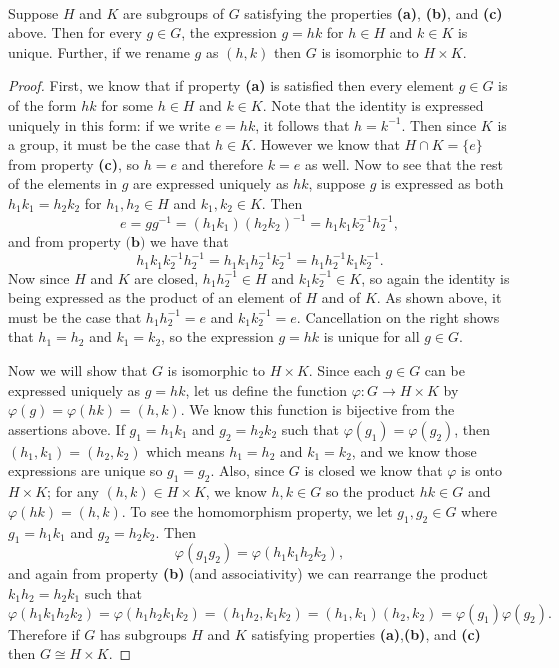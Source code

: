 \documentclass{article}
\newenvironment{problem1}[1]{\noindent {\bf Problem #1:}}
{\medskip}
\begin{document}
\begin{problem1}{51}\\ Suppose $H$ and $K$ are subgroups of $G$ satisfying the properties \textbf{(a)}, \textbf{(b)}, and \textbf{(c)} above. Then for every $g\in G$, the expression $g=hk$ for $h\in H$ and $k\in K$ is unique. Further, if we rename $g$ as $(h,k)$ then $G$ is isomorphic to $H\times K$.
\end{problem1}

\begin{proof} First, we know that if property \textbf{(a)} is satisfied then every element $g\in G$ is of the form $hk$ for some $h\in H$ and $k\in K$. Note that the identity is expressed uniquely in this form: if we write $e=hk$, it follows that $h=k^{-1}$. Then since $K$ is a group, it must be the case that $h\in K$. However we know that $H\cap K=\{e\}$ from property \textbf{(c)}, so $h=e$ and therefore $k=e$ as well. Now to see that the rest of the elements in $g$ are expressed uniquely as $hk$, suppose $g$ is expressed as both $h_1k_1=h_2k_2$ for $h_1,h_2\in H$ and $k_1,k_2\in K$. Then $$e=gg^{-1}=(h_1k_1)(h_2k_2)^{-1}=h_1k_1k_2^{-1}h_2^{-1},$$ and from property $\textbf{(b)}$ we have that $$h_1k_1k_2^{-1}h_2^{-1}=h_1k_1h_2^{-1}k_2^{-1}=h_1h_2^{-1}k_1k_2^{-1}.$$ Now since $H$ and $K$ are closed, $h_1h_2^{-1}\in H$ and $k_1k_2^{-1}\in K$, so again the identity is being expressed as the product of an element of $H$ and of $K$. As shown above, it must be the case that $h_1h_2^{-1}=e$ and $k_1k_2^{-1}=e$. Cancellation on the right shows that $h_1=h_2$ and $k_1=k_2$, so the expression $g=hk$ is unique for all $g\in G$.

Now we will show that $G$ is isomorphic to $H\times K$. Since each $g\in G$ can be expressed uniquely as $g=hk$, let us define the function $\varphi:G\to H\times K$ by $\varphi(g)=\varphi(hk)=(h,k).$ We know this function is bijective from the assertions above. If $g_1=h_1k_1$ and $g_2=h_2k_2$ such that $\varphi(g_1)=\varphi(g_2)$, then $ (h_1,k_1)=(h_2, k_2)$ which means $h_1=h_2$ and $k_1=k_2$, and we know those expressions are unique so $g_1=g_2$. Also, since $G$ is closed we know that $\varphi$ is onto $H\times K$; for any $(h,k)\in H\times K$, we know $h,k\in G$ so the product $hk\in G$ and $\varphi(hk)=(h,k)$. To see the homomorphism property, we let $g_1,g_2\in G$ where $g_1=h_1k_1$ and $g_2=h_2k_2$. Then $$\varphi(g_1g_2)=\varphi(h_1k_1h_2k_2),$$ and again from property \textbf{(b)} (and associativity) we can rearrange the product $k_1h_2=h_2k_1$ such that $$\varphi(h_1k_1h_2k_2)=\varphi(h_1h_2k_1k_2)=(h_1h_2,k_1k_2)=(h_1,k_1)(h_2,k_2)=\varphi(g_1)\varphi(g_2).$$
Therefore if $G$ has subgroups $H$ and $K$ satisfying properties \textbf{(a)},\textbf{(b)}, and \textbf{(c)} then $G\cong H\times K$.
\end{proof}
\end{document}
